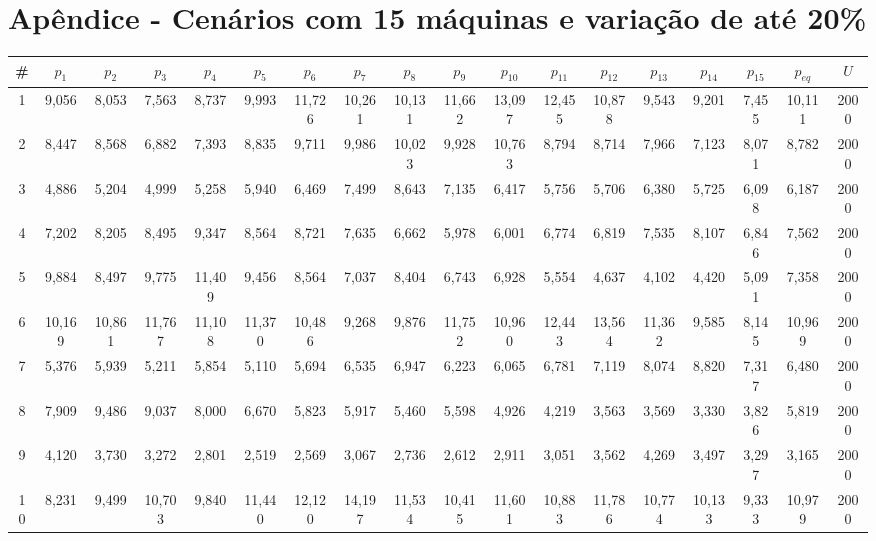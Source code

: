 \newpage
\section{Apêndice - Cenários com 15 máquinas e variação de até 20\%}\label{app:tab15machine20}
{\tiny\tabcolsep=2pt %
\begin{longtable}{ >{\tiny}cccccccccccccccccc}
\hline
\#  & $p_1$     & $p_2$     & $p_3$     & $p_4$     & $p_5$     & $p_6$     & $p_7$     & $p_8$     & $p_9$     & $p_{10}$    & $p_{11}$    & $p_{12}$    & $p_{13}$    & $p_{14}$    & $p_{15}$    & $p_{eq}$    & $U$    \\ \hline
1   & 9,056  & 8,053  & 7,563  & 8,737  & 9,993  & 11,726 & 10,261 & 10,131 & 11,662 & 13,097 & 12,455 & 10,878 & 9,543  & 9,201  & 7,455  & 10,111 & 2000 \\
2   & 8,447  & 8,568  & 6,882  & 7,393  & 8,835  & 9,711  & 9,986  & 10,023 & 9,928  & 10,763 & 8,794  & 8,714  & 7,966  & 7,123  & 8,071  & 8,782  & 2000 \\
3   & 4,886  & 5,204  & 4,999  & 5,258  & 5,940  & 6,469  & 7,499  & 8,643  & 7,135  & 6,417  & 5,756  & 5,706  & 6,380  & 5,725  & 6,098  & 6,187  & 2000 \\
4   & 7,202  & 8,205  & 8,495  & 9,347  & 8,564  & 8,721  & 7,635  & 6,662  & 5,978  & 6,001  & 6,774  & 6,819  & 7,535  & 8,107  & 6,846  & 7,562  & 2000 \\
5   & 9,884  & 8,497  & 9,775  & 11,409 & 9,456  & 8,564  & 7,037  & 8,404  & 6,743  & 6,928  & 5,554  & 4,637  & 4,102  & 4,420  & 5,091  & 7,358  & 2000 \\
6   & 10,169 & 10,861 & 11,767 & 11,108 & 11,370 & 10,486 & 9,268  & 9,876  & 11,752 & 10,960 & 12,443 & 13,564 & 11,362 & 9,585  & 8,145  & 10,969 & 2000 \\
7   & 5,376  & 5,939  & 5,211  & 5,854  & 5,110  & 5,694  & 6,535  & 6,947  & 6,223  & 6,065  & 6,781  & 7,119  & 8,074  & 8,820  & 7,317  & 6,480  & 2000 \\
8   & 7,909  & 9,486  & 9,037  & 8,000  & 6,670  & 5,823  & 5,917  & 5,460  & 5,598  & 4,926  & 4,219  & 3,563  & 3,569  & 3,330  & 3,826  & 5,819  & 2000 \\
9   & 4,120  & 3,730  & 3,272  & 2,801  & 2,519  & 2,569  & 3,067  & 2,736  & 2,612  & 2,911  & 3,051  & 3,562  & 4,269  & 3,497  & 3,297  & 3,165  & 2000 \\
10  & 8,231  & 9,499  & 10,703 & 9,840  & 11,440 & 12,120 & 14,197 & 11,534 & 10,415 & 11,601 & 10,883 & 11,786 & 10,774 & 10,133 & 9,333  & 10,979 & 2000 \\

\end{longtable}}
